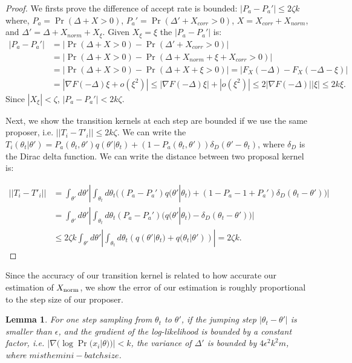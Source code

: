 \documentclass{article}
\newtheorem{lemma}{Lemma}
\begin{document}
\begin{proof}
We firsts prove the difference of accept rate is bounded: $|P_a - P_a'| \leq 2\zeta k$ where, $P_a =
\Pr (\Delta + X > 0)$, $P_a' = \Pr(\Delta' + X_{corr} > 0)$, $X= X_{corr} + X_{norm}$, and $\Delta'
= \Delta + X_{norm} + X_\xi$. Given $X_\xi = \xi$ the $|P_a - P_a'|$ is:
\begin{align*}
|P_a - P_a'| &= |\Pr(\Delta + X >0) - \Pr(\Delta' + X_{corr} > 0)|\\
& = | \Pr (\Delta + X > 0) - \Pr (\Delta + X_{norm} + \xi + X_{corr} >0) |    \\
&= |\Pr (\Delta + X > 0) -\Pr(\Delta + X + \xi >0)| = |F_X(-\Delta)- F_X(-\Delta - \xi)| \\
&= |\nabla F(-\Delta) \xi + o(\xi^2)| \leq  |\nabla F(-\Delta) \xi| +| o(\xi^2)| \leq 2|\nabla F(-\Delta)| |\xi| \leq 2k \xi.
\end{align*}
Since $|X_\xi| < \zeta$, $|P_a - P_a'| < 2k\zeta$.

Next, we show the transition kernels at each step are bounded if we use the same proposer, i.e.
$||T_i - T'_i||\leq 2k\zeta$. We can write the $T_i(\theta_t|\theta') = P_a(\theta_t, \theta')
q(\theta'|\theta_t) + (1-P_a(\theta_t,\theta')) \delta_D(\theta' - \theta_t)$, where $\delta_D$ is
the Dirac delta function. We can write the distance between two proposal kernel is:

\begin{align*}
||T_i - T'_i || &= \int_{\theta'} d\theta' |\int_{\theta_t} d\theta_t ((P_a-P_a') q(\theta'|\theta_t) + (1-P_a - 1+P_a') \delta_D(\theta_t -\theta')) | \\
& = \int_{\theta'} d\theta' |\int _{\theta_t} d\theta_t (P_a- P_a')(q(\theta'|\theta_t) - \delta_D(\theta_t - \theta')) | \\ 
& \leq 2 \zeta k \int_{\theta'}d\theta' | \int_{\theta_t} d\theta_t (q(\theta'|\theta_t) + q(\theta_t|\theta'))| = 2 \zeta k.
\end{align*}
\end{proof}

Since the accuracy of our transition kernel is related to how accurate our estimation of $X_{\rm
norm}$, we show the error of our estimation is roughly proportional to the step size of our
proposer.

\begin{lemma}
For one step sampling from $\theta_t$ to $\theta'$, if the jumping step  $|\theta_t - \theta'|$ is
smaller than $\epsilon$, and the gradient of the log-likelihood is bounded by a constant factor,
i.e. $|\nabla (\log \Pr(x_i| \theta))| < k$, the variance of $\Delta'$ is bounded by $4\epsilon^2
k^2 m$, where $m is the mini-batch size$.
\end{lemma}
\end{document}
